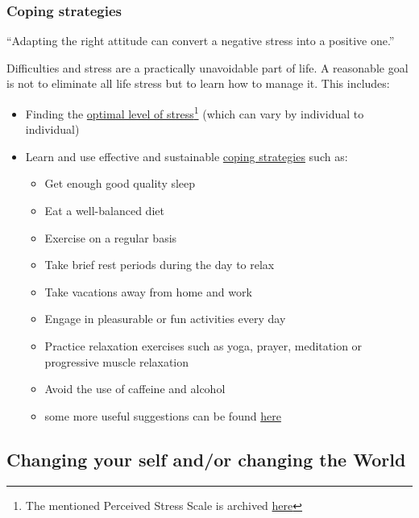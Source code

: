 \documentclass{article}
\begin{document}
\subsubsection{Coping strategies}

\vspace{1cm}
{``Adapting the right attitude can convert a negative stress into a positive one.''
\\[5pt]
}

Difficulties and stress are a practically unavoidable part of life. A reasonable goal is not to eliminate all life stress but to learn how to manage it.
This includes:
\begin{itemize}
    \item Finding the \href{https://hbr.org/2016/04/are-you-too-stressed-to-be-productive-or-not-stressed-enough}{optimal level of stress}\footnote{The mentioned Perceived Stress Scale is archived \href{https://web.archive.org/web/20160503100044/http://www.psy.cmu.edu/~scohen/globalmeas83.pdf}{here}} (which can vary by individual to individual)
    \item Learn and use effective and sustainable \href{https://my.clevelandclinic.org/health/articles/6392-stress-coping-with-lifes-stressors}{coping strategies} such as:
    \begin{itemize}
        \item Get enough good quality sleep
        \item Eat a well-balanced diet
        \item Exercise on a regular basis
        \item Take brief rest periods during the day to relax
        \item Take vacations away from home and work
        \item Engage in pleasurable or fun activities every day
        \item Practice relaxation exercises such as yoga, prayer, meditation or progressive muscle relaxation
        \item Avoid the use of caffeine and alcohol
        \item some more useful suggestions can be found \href{https://courses.lumenlearning.com/suny-monroecc-hed110/chapter/managing-stress/}{here}
    \end{itemize}
\end{itemize}

\subsection{Changing your self and/or changing the World}
\end{document}
